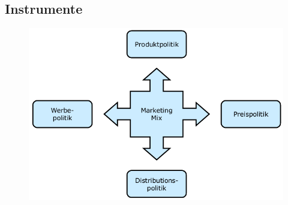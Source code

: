 \documentclass[a4paper,11pt, twoside]{article}
\begin{document}
\subsection{Instrumente}

\begin{figure}[h]
 \begin{center}
   \includegraphics[scale=0.3]{bilder/instrumente_produktpolitik.png}
 \end{center}
\end{figure}
\end{document}
